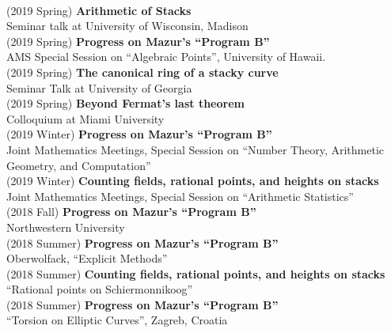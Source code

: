 \documentclass[margin,line]{res}
\begin{document}
\begin{resume}
\vspace{.05cm}\\
(2019 Spring) \textbf{Arithmetic of Stacks}\\  
Seminar talk at  University of Wisconsin, Madison
\vspace{.05cm}\\
(2019 Spring) \textbf{Progress on Mazur's ``Program B''}\\  
AMS Special Session on ``Algebraic Points'', University of Hawaii.
\vspace{.05cm}\\
(2019 Spring) \textbf{The canonical ring of a stacky curve}\\  
Seminar Talk at University of Georgia
\vspace{.05cm}\\
(2019 Spring) \textbf{Beyond Fermat's last theorem}\\
Colloquium at Miami University 
\vspace{.05cm}\\
(2019 Winter) \textbf{Progress on Mazur's ``Program B''}\\  
Joint Mathematics Meetings, Special Session on ``Number Theory, Arithmetic Geometry, and Computation''
\vspace{.05cm}\\
(2019 Winter) \textbf{Counting fields, rational points, and heights on stacks}\\
Joint Mathematics Meetings, Special Session on ``Arithmetic Statistics''
\vspace{.05cm}\\
(2018 Fall) \textbf{Progress on Mazur's ``Program B''}\\  
Northwestern University
\vspace{.05cm}\\
(2018 Summer) \textbf{Progress on Mazur's ``Program B''}\\  
Oberwolfack, ``Explicit Methods''
\vspace{.05cm}\\
(2018 Summer) \textbf{Counting fields, rational points, and heights on stacks}\\
``Rational points on Schiermonnikoog''
\vspace{.05cm}\\
(2018 Summer) \textbf{Progress on Mazur's ``Program B''}\\  
``Torsion on Elliptic Curves'', Zagreb, Croatia
\vspace{.05cm}\\

\end{resume}
\end{document}
